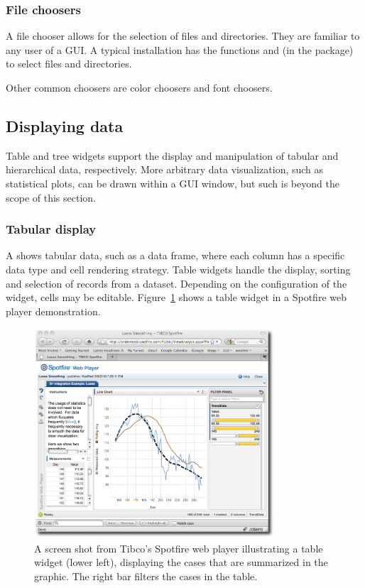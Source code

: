 \subsubsection{File choosers}
\label{sec:GUI:file-choosers}

A file chooser allows for the selection of files and directories. They
are familiar to any user of a GUI. A typical \R\/ installation has the
functions  and  (in
the  package) to select files and directories.

Other common choosers are color choosers and font choosers.

\subsection{Displaying data}
\label{sec:GUI:tabular-display}

Table and tree widgets support the display and manipulation of tabular
and hierarchical data, respectively. More arbitrary data
visualization, such as statistical plots, can be drawn within a GUI
window, but such is beyond the scope of this section.


\subsubsection{Tabular display}

A  shows tabular data, such as a data frame, where
each column has a specific data type and cell rendering strategy.
Table widgets handle the display, sorting and selection of records
from a dataset. Depending on the configuration of the widget, cells
may be editable.  Figure~\ref{fig:GUI:spotfire} shows a table widget
in a Spotfire web player demonstration. 

\begin{figure}
  \centering
  \includegraphics[width=0.8\textwidth]{fig-spotfire}
  \caption{A screen shot from Tibco's Spotfire web player illustrating
    a table widget (lower left), displaying the cases that are
    summarized in the graphic. The right bar filters the cases in the table. }
  \label{fig:GUI:spotfire}
\end{figure}


